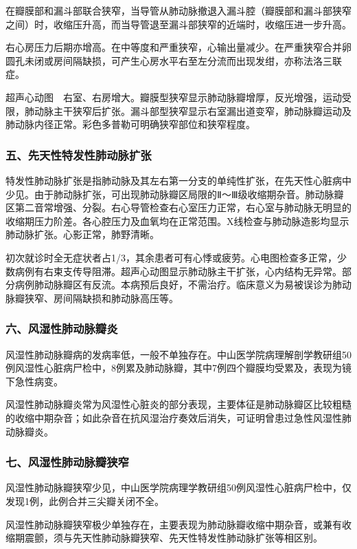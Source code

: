 在瓣膜部和漏斗部联合狭窄，当导管从肺动脉撤退入漏斗腔（瓣膜部和漏斗部狭窄之间）时，收缩压升高，而当导管退至漏斗部狭窄的近端时，收缩压进一步升高。

右心房压力后期亦增高。在中等度和严重狭窄，心输出量减少。在严重狭窄合并卵圆孔未闭或房间隔缺损，可产生心房水平右至左分流而出现发绀，亦称法洛三联症。

超声心动图　右室、右房增大。瓣膜型狭窄显示肺动脉瓣增厚，反光增强，运动受限，肺动脉主干狭窄后扩张。漏斗部型狭窄显示右室漏出道变窄，肺动脉瓣运动及肺动脉内径正常。彩色多普勒可明确狭窄部位和狭窄程度。

\subsubsection{五、先天性特发性肺动脉扩张}

特发性肺动脉扩张是指肺动脉及其左右第一分支的单纯性扩张，在先天性心脏病中少见。由于肺动脉扩张，可出现肺动脉瓣区局限的Ⅱ～Ⅲ级收缩期杂音。肺动脉瓣区第二音常增强、分裂。右心导管检查右心室压力正常，右心室与肺动脉无明显的收缩期压力阶差。各心腔压力及血氧均在正常范围。X线检查与肺动脉造影均显示肺动脉扩张。心影正常，肺野清晰。

初次就诊时全无症状者占1/3，其余患者可有心悸或疲劳。心电图检查多正常，少数病例有右束支传导阻滞。超声心动图显示肺动脉主干扩张，心内结构无异常。部分病例肺动脉瓣区有反流。本病预后良好，不需治疗。临床意义为易被误诊为肺动脉瓣狭窄、房间隔缺损和肺动脉高压等。

\subsubsection{六、风湿性肺动脉瓣炎}

风湿性肺动脉瓣病的发病率低，一般不单独存在。中山医学院病理解剖学教研组50例风湿性心脏病尸检中，8例累及肺动脉瓣，其中7例四个瓣膜均受累及，表现为镜下急性病变。

风湿性肺动脉瓣炎常为风湿性心脏炎的部分表现，主要体征是肺动脉瓣区比较粗糙的收缩中期杂音；如此杂音在抗风湿治疗奏效后消失，可证明曾患过急性风湿性肺动脉瓣炎。

\subsubsection{七、风湿性肺动脉瓣狭窄}

风湿性肺动脉瓣狭窄少见，中山医学院病理学教研组50例风湿性心脏病尸检中，仅发现1例，此例合并三尖瓣关闭不全。

风湿性肺动脉瓣狭窄极少单独存在，主要表现为肺动脉瓣收缩中期杂音，或兼有收缩期震颤，须与先天性肺动脉瓣狭窄、先天性特发性肺动脉扩张等相区别。

